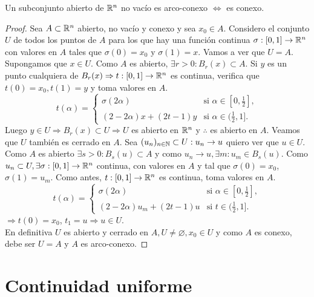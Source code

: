 \begin{theorem}
  Un subconjunto abierto de $\mathbb{R}^n$ no vacío es arco-conexo $\iff$ es conexo.

  \begin{proof}
    Sea $A \subset \mathbb{R}^n$ abierto, no vacío y conexo y sea $x_0 \in A$. Considero el conjunto $U$ de todos los puntos de $A$ para los que hay una función continua $\sigma: [0, 1] \to \mathbb{R}^n$ con valores en $A$ tales que $\sigma(0) = x_0$ y $\sigma(1) = x$. Vamos a ver que $U = A$. \\
    Supongamos que $x \in U$. Como $A$ es abierto, $\exists r > 0 : B_r(x) \subset A$. Si $y$ es un punto cualquiera de $B_r(x) \Rightarrow t: [0, 1] \to \mathbb{R}^n$ es continua, verifica que $t(0) = x_0, t(1) = y$ y toma valores en $A$.
    \begin{equation}
      t(\alpha) = \begin{cases}
        \sigma(2\alpha)           & \text{si } \alpha \in [0, \frac{1}{2}], \\
        (2 - 2 \alpha)x + (2t-1)y & \text{si } \alpha \in (\frac{1}{2}, 1].
      \end{cases}
    \end{equation} Luego $y \in U \Rightarrow B_r(x) \subset U \Rightarrow U$ es abierto en $\mathbb{R}^n$ y $\therefore$ es abierto en $A$. Veamos que $U$ también es cerrado en $A$. Sea $(u_n)_{n \in \mathbb{N}} \subset U : u_n \to u$ quiero ver que $u \in U$. Como $A$ es abierto $\exists s > 0 : B_s(u) \subset A$ y como $u_n \to u, \exists m : u_m \in B_s(u)$. Como $u_n \subset U, \exists \sigma: [0, 1] \to \mathbb{R}^n$ continua, con valores en $A$ y tal que $\sigma(0) = x_0$, $\sigma(1) = u_m$. Como antes, $t: [0, 1] \to \mathbb{R}^n$ es continua, toma valores en $A$.
    \begin{equation} t(\alpha) = \begin{cases}
        \sigma(2\alpha)                & \text{si } \alpha \in [0, \frac{1}{2}], \\
        (2 - 2\alpha) u_m + (2t - 1) u & \text{si } t \in (\frac{1}{2}, 1].
      \end{cases}
    \end{equation}$\Rightarrow t(0) = x_0$, $t_1 = u \Rightarrow u \in U$. \\
    En definitiva $U$ es abierto y cerrado en $A, U \neq \varnothing, x_0 \in U$ y como $A$ es conexo, debe ser $U = A$ y $A$ es arco-conexo.
  \end{proof}
\end{theorem}

\section{Continuidad uniforme}

